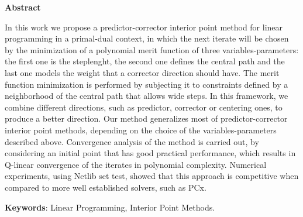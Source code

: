 \begin{center}
  \large{\textbf{Abstract}}
\end{center}




In this work we propose a predictor-corrector interior point method for linear programming in a primal-dual context, in which the next iterate will be chosen by the minimization of a polynomial merit function  of three variables-parameters: the first one is the steplenght, the second one defines the central path and the last one models the weight that a corrector direction should have. The merit function minimization is performed by subjecting it to constraints defined by a neighborhood of the central path that allows wide steps. In this framework, we combine  different directions, such as predictor, corrector or centering ones, to produce a better direction. Our method generalizes most of predictor-corrector interior point methods, depending on the choice of the variables-parameters described above. Convergence analysis of the method is carried out, by considering an initial point that has good practical performance, which results in Q-linear convergence of the iterates in polynomial complexity. Numerical experiments, using Netlib set test,  showed that this approach is competitive when compared to more well established solvers, such as PCx.





\vspace{.5cm}
\textbf{Keywords}:
Linear Programming, Interior Point Methods.
